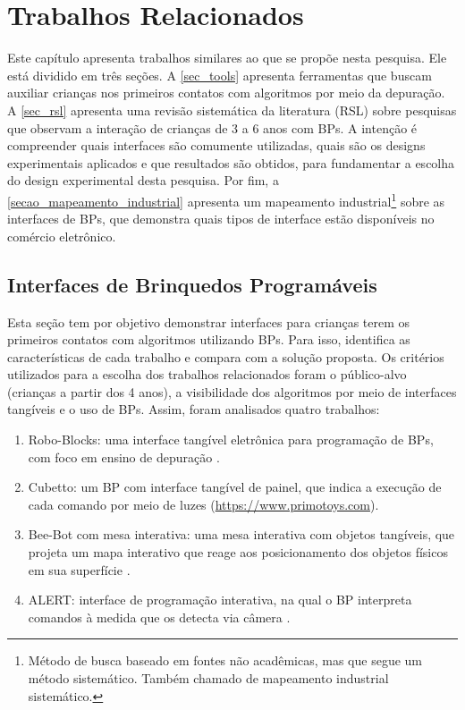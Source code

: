 \chapter{Trabalhos Relacionados}
\label{c_estado_arte}

Este capítulo apresenta trabalhos similares ao que se propõe nesta pesquisa. Ele está dividido em três seções. A \autoref{sec_tools} apresenta ferramentas que buscam auxiliar crianças nos primeiros contatos com algoritmos por meio da depuração. A \autoref{sec_rsl} apresenta uma revisão sistemática da literatura (RSL) sobre pesquisas que observam a interação de crianças de 3 a 6 anos com BPs. A intenção é compreender quais interfaces são comumente utilizadas, quais são os designs experimentais aplicados e que resultados são obtidos, para fundamentar a escolha do design experimental desta pesquisa. Por fim, a \autoref{secao_mapeamento_industrial} apresenta um mapeamento industrial\footnote{Método de busca baseado em fontes não acadêmicas, mas que segue um método sistemático. Também chamado de mapeamento industrial sistemático.} sobre as interfaces de BPs, que demonstra quais tipos de interface estão disponíveis no comércio eletrônico. %

\section{Interfaces de Brinquedos Programáveis}
\label{sec_tools}
Esta seção tem por objetivo demonstrar interfaces para crianças terem os primeiros contatos com algoritmos utilizando BPs. Para isso, identifica as características de cada trabalho e compara com a solução proposta. Os critérios utilizados para a escolha dos trabalhos relacionados foram o público-alvo (crianças a partir dos 4 anos), a visibilidade dos algoritmos por meio de interfaces tangíveis e o uso de BPs. Assim, foram analisados quatro trabalhos:

\begin{enumerate}
    \item Robo-Blocks: uma interface tangível eletrônica para programação de BPs, com foco em ensino de depuração \cite{sipitakiat_robo-blocks_2012}.
    \item Cubetto: um BP com interface tangível de painel, que indica a execução de cada comando por meio de luzes (\url{https://www.primotoys.com}).
    \item Bee-Bot com mesa interativa: uma mesa interativa com objetos tangíveis, que projeta um mapa interativo que reage aos posicionamento dos objetos físicos em sua superfície \cite{beraza_soft_2010}.
    \item ALERT: interface de programação interativa, na qual o BP interpreta comandos à medida que os detecta via câmera \cite{burleson_active_2018}.
\end{enumerate}


